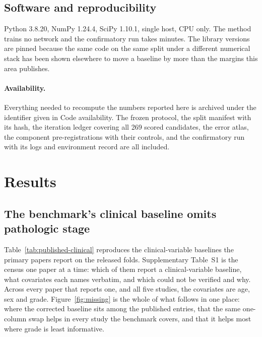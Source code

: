 \documentclass[unnumsec,webpdf,contemporary,large]{oup-authoring-template}
\begin{document}
\subsection{Software and reproducibility}

Python 3.8.20, NumPy 1.24.4, SciPy 1.10.1, single host, CPU only. The method trains no network and
the confirmatory run takes minutes. The library versions are pinned because the same code on the
same split under a different numerical stack has been shown elsewhere to move a baseline by more
than the margins this area publishes.

\paragraph{Availability.} Everything needed to recompute the numbers reported here is archived under
the identifier given in Code availability. The frozen protocol, the split manifest with its hash,
the iteration ledger covering all 269 scored candidates, the error atlas, the component
pre-registrations with their controls, and the confirmatory run with its logs and environment record
are all included.

\section{Results}
\subsection{The benchmark's clinical baseline omits pathologic stage}

Table~\ref{tab:published-clinical} reproduces the clinical-variable baselines the primary papers
report on the released folds. Supplementary Table~S1 is the census one paper at a time:
which of them report a clinical-variable baseline, what covariates each names verbatim, and which
could not be verified and why. Across every paper that reports
one, and all five studies, the covariates are age, sex and grade. Figure~\ref{fig:missing} is the whole of what follows in one place: where the
corrected baseline sits among the published entries, that the same one-column swap helps in every
study the benchmark covers, and that it helps most where grade is least informative.
\end{document}
